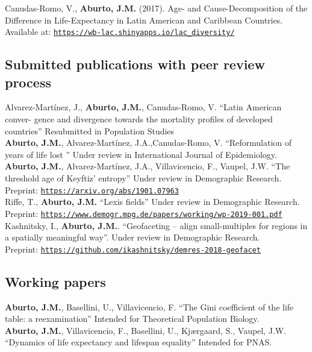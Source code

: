 \documentclass[12pt]{article}
\providecommand*\url[1]{\href{#1}{#1}}
\renewcommand*\url[1]{\href{#1}{\texttt{#1}}}
\begin{document}
Canudas-Romo, V., \textbf{Aburto, J.M.} (2017). Age- and Cause-Decomposition of the Difference in Life-Expectancy in Latin American and Caribbean Countries. Available at: \small{\url{https://wb-lac.shinyapps.io/lac\_diversity/}} \\ 


\subsection*{ Submitted publications with peer review process}	

Alvarez-Mart\'inez, J., \textbf{Aburto, J.M.}, Canudas-Romo, V. ``Latin American conver-
gence and divergence towards the mortality profiles of developed countries''  Resubmitted in Population Studies\\
  
\textbf{Aburto, J.M.}, Alvarez-Mart\'inez, J.A.,Canudas-Romo, V. ``Reformulation of years of life lost '' Under review in International Journal of Epidemiology.\\

\textbf{Aburto, J.M.}, Alvarez-Mart\'inez, J.A., Villavicencio, F., Vaupel, J.W. ``The threshold age of Keyftiz' entropy'' Under review in Demographic Research.\\
Preprint: \url{https://arxiv.org/abs/1901.07963}\\

Riffe, T., \textbf{Aburto, J.M.} ``Lexis fields'' Under review in Demographic Research. \\
Preprint: \url{https://www.demogr.mpg.de/papers/working/wp-2019-001.pdf}\\

 
Kashnitsky, I., \textbf{Aburto, J.M.}. ``Geofaceting – align small-multiples for regions in a
spatially meaningful way''. Under review in Demographic Research.\\
Preprint: \url{https://github.com/ikashnitsky/demres-2018-geofacet}\\
 
\subsection*{Working papers}
\textbf{Aburto, J.M.}, Basellini, U., Villavicencio, F. ``The Gini coefficient of the life table: a reexamination'' Intended for Theoretical Population Biology. \\
 
 
\textbf{Aburto, J.M.},  Villavicencio, F., Basellini, U., Kj{\ae}rgaard, S., Vaupel, J.W. ``Dynamics of life expectancy and lifespan equality'' Intended for PNAS. \\
 
\end{document}
